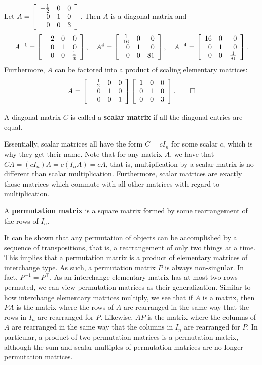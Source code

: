 \begin{Exam} Let $A = \mtx{rrr}{-\frac{1}{2} & 0 & 0\\ 0 & 1 & 0 \\0& 0& 3}$. Then $A$ is a diagonal matrix and
\[A^{-1} =\mtx{rrr}{-2 & 0 & 0\\ 0 & 1& 0 \\0& 0& \frac{1}{3}}, \quad A^4 = \mtx{rrr}{\frac{1}{16} & 0 & 0\\ 0 & 1& 0 \\0& 0& 81}, \quad A^{-4} = \mtx{rrr}{16 & 0 & 0\\ 0 & 1& 0 \\0& 0& \frac{1}{81}}.\] Furthermore, $A$ can be factored into a product of scaling elementary matrices:
\[A = \mtx{rrr}{-\frac{1}{2}&0&0\\0&1&0\\0&0&1}\mtx{rrr}{1&0&0\\0&1&0\\0&0&3}.\qedhere\]
\end{Exam}\vs

\begin{Def} A diagonal matrix $C$ is called a \textbf{scalar matrix} if all the diagonal entries are equal.
\end{Def}\vs

Essentially, scalar matrices all have the form $C = cI_n$ for some scalar $c$, which is why they get their name. Note that for any matrix $A$, we have that $CA = (cI_n)A = c(I_nA) = cA$, that is, multiplication by a scalar matrix is no different than scalar multiplication. Furthermore, scalar matrices are exactly those matrices which commute with all other matrices with regard to multiplication.\\


\begin{Def} A \textbf{permutation matrix} is a square matrix formed by some rearrangement of the rows of $I_n$.\end{Def}\vs

It can be shown that any permutation of objects can be accomplished by a sequence of transpositions, that is, a rearrangement of only two things at a time. This implies that a permutation matrix is a product of elementary matrices of interchange type. As such, a permutation matrix $P$ is always non-singular. In fact, $P^{-1}=P^\top $. As an interchange elementary matrix has at most two rows permuted, we can view permutation matrices as their generalization. Similar to how interchange elementary matrices multiply, we see that if $A$ is a matrix, then $PA$ is the matrix where the rows of $A$ are rearranged in the same way that the rows in $I_n$ are rearranged for $P$.  Likewise, $AP$ is the matrix where the columns of $A$ are rearranged in the same way that the columns in $I_n$ are rearranged for $P$. In particular, a product of two permutation matrices is a permutation matrix, although the sum and scalar multiples of permutation matrices are no longer permutation matrices.\\

